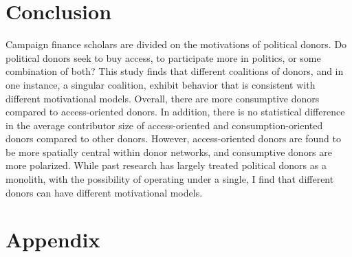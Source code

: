\documentclass[12pt,]{article}
\begin{document}
\hypertarget{conclusion}{%
\section{Conclusion}\label{conclusion}}

Campaign finance scholars are divided on the motivations of political
donors. Do political donors seek to buy access, to participate more in
politics, or some combination of both? This study finds that different
coalitions of donors, and in one instance, a singular coalition, exhibit
behavior that is consistent with different motivational models. Overall,
there are more consumptive donors compared to access-oriented donors. In
addition, there is no statistical difference in the average contributor
size of access-oriented and consumption-oriented donors compared to
other donors. However, access-oriented donors are found to be more
spatially central within donor networks, and consumptive donors are more
polarized. While past research has largely treated political donors as a
monolith, with the possibility of operating under a single, I find that
different donors can have different motivational models.

\newpage

\hypertarget{appendix}{%
\section{Appendix}\label{appendix}}
\end{document}
